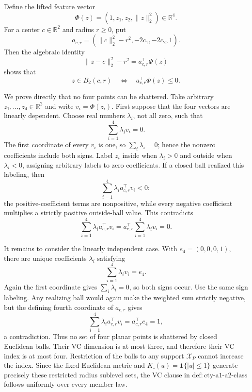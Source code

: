 Define the lifted feature vector
\[
 \Phi(z)=(1,z_1,z_2,\lVert z\rVert_2^2)\in\mathbb R^4.
\]
For a center \(c\in\mathbb R^2\) and radius \(r\geq0\), put
\[
 a_{c,r}=(\lVert c\rVert_2^2-r^2,-2c_1,-2c_2,1).
\]
Then the algebraic identity
\[
 \lVert z-c\rVert_2^2-r^2=a_{c,r}^{\top}\Phi(z)
\]
shows that
\[
 z\in B_2(c,r)\quad\Longleftrightarrow\quad
 a_{c,r}^{\top}\Phi(z)\leq0.
\]

We prove directly that no four points can be shattered.  Take arbitrary \(z_1,\ldots,z_4\in\mathbb R^2\) and write \(v_i=\Phi(z_i)\).  First suppose that the four vectors are linearly dependent.  Choose real numbers \(\lambda_i\), not all zero, such that
\[
 \sum_{i=1}^4\lambda_i v_i=0.
\]
The first coordinate of every \(v_i\) is one, so \(\sum_i\lambda_i=0\); hence the nonzero coefficients include both signs.  Label \(z_i\) inside when \(\lambda_i>0\) and outside when \(\lambda_i<0\), assigning arbitrary labels to zero coefficients.  If a closed ball realized this labeling, then
\[
 \sum_{i=1}^4\lambda_i a_{c,r}^{\top}v_i<0:
\]
the positive-coefficient terms are nonpositive, while every negative coefficient multiplies a strictly positive outside-ball value.  This contradicts
\[
 \sum_{i=1}^4\lambda_i a_{c,r}^{\top}v_i
 =a_{c,r}^{\top}\sum_{i=1}^4\lambda_i v_i=0.
\]

It remains to consider the linearly independent case.  With \(e_4=(0,0,0,1)\), there are unique coefficients \(\lambda_i\) satisfying
\[
 \sum_{i=1}^4\lambda_i v_i=e_4.
\]
Again the first coordinate gives \(\sum_i\lambda_i=0\), so both signs occur.  Use the same sign labeling.  Any realizing ball would again make the weighted sum strictly negative, but the defining fourth coordinate of \(a_{c,r}\) gives
\[
 \sum_{i=1}^4\lambda_i a_{c,r}^{\top}v_i
 =a_{c,r}^{\top}e_4=1,
\]
a contradiction.  Thus no set of four planar points is shattered by closed Euclidean balls.  Their VC dimension is at most three, and therefore their VC index is at most four.  Restriction of the balls to any support \(\mathcal X_P\) cannot increase the index.  Since the fixed Euclidean metric and \(K_\square(u)=\mathbf 1\{|u|\leq1\}\) generate precisely these restricted radius sublevel sets, the VC clause in \(\mathrm{def:cty\text{-}a1\text{-}a2\text{-}class}\) follows uniformly over every member law.